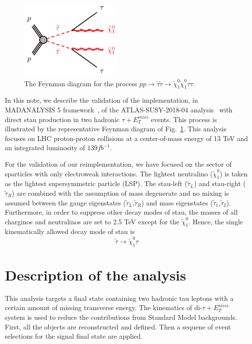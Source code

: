 \documentclass{ws-mpla}
\begin{document}
\begin{figure}[t]
  \centerline{\includegraphics[width=2.0in]{fig_01}}
  \vspace*{8pt}
  \caption{The Feynman diagram for the process $pp\rightarrow\tilde{\tau}\tilde{\tau}\rightarrow\tilde{\chi}^0_1\tilde{\chi}^0_1\tau\tau$.\protect\label{fig:fig_01}}
\end{figure}

In this note, we describe the validation of the implementation, in MADANALYSIS 5 framework~\cite{Conte:2018vmg,Dumont:2014tja,Conte:2014zja,Conte:2012fm}, of the ATLAS-SUSY-2018-04 analysis~\cite{Aad:2019byo} with direct stau production in two hadronic $\tau +E^{miss}_T$ events. 
This process is illustrated by the representative Feynman diagram of Fig.~\ref{fig:fig_01}. 
This analysis focuses on LHC proton-proton collisions at a center-of-mass energy of 13 TeV and an integrated luminosity of $139 fb^{-1}$.

For the validation of our reimplementation, we have focused on the sector of sparticles with only electroweak interactions. 
The lightest neutralino ($\tilde{\chi}^0_1$) is taken as the lightest supersymmetric particle (LSP). 
The stau-left ($\tilde{\tau}_L$) and stau-right ($\tilde{\tau}_R$) are combined with the assumption of mass degenerate and no mixing is assumed between the gauge eigenstates ($\tilde{\tau}_L$,$\tilde{\tau}_R$) and mass eigenstates ($\tilde{\tau}_1$,$\tilde{\tau}_2$). 
Furthermore, in order to suppress other decay modes of stau, the masses of all charginos and neutralinos are set to 2.5 TeV except for the $\tilde{\chi}^0_1$. 
Hence, the single kinematically allowed decay mode of stau is 
\begin{equation}
\tilde{\tau}\rightarrow\tilde{\chi}^0_1 \tau 
\end{equation}
 

\section{Description of the analysis}

This analysis targets a final state containing two hadronic tau leptons with a certain amount of missing transverse energy. 
The kinematics of di-$\tau +E^{miss}_T$ system is used to reduce the contributions from Standard Model backgrounds. 
First, all the objects are reconstructed and defined. Then a sequene of event selections for the signal final state are applied.
\end{document}
